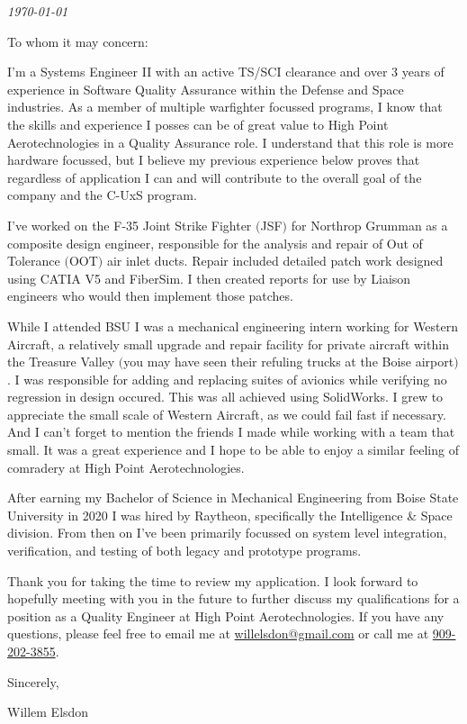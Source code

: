 \documentclass{ExpressiveCoverLetter}
\begin{document}
\coverletterheader[
    firstname=Willem,
    middleinitial=N,
    lastname=Elsdon,
    email=willelsdon@gmail.com,
    phone=909-202-3855,
    linkedin=willem-elsdon,
    github=welsdon,
    city=Boise,
    state=Idaho
]

\vspace{0.05in}
\emph{\today}
\vspace{0.15in}


To whom it may concern:

I'm a Systems Engineer II with an active TS/SCI clearance and over 3 years of experience in Software
Quality Assurance within the Defense and Space industries. As a member
of multiple warfighter focussed programs, I know that
the skills and experience I posses can be of great value to High Point
Aerotechnologies in a Quality Assurance role. I understand that this
role is more hardware focussed, but I believe my previous experience
below proves that regardless of application I can and will contribute to
the overall goal of the company and the C-UxS program.

I've worked on the F-35 Joint Strike Fighter $($JSF$)$ for Northrop
Grumman as a composite design engineer, responsible for the analysis and
repair of
Out of Tolerance $($OOT$)$ air inlet ducts. Repair included detailed
patch work designed using CATIA V5 and FiberSim. I then created reports
for use by Liaison engineers who would then implement those patches.

While I attended BSU I was a mechanical engineering intern working for
Western Aircraft, a relatively small upgrade and repair facility for
private aircraft within the Treasure Valley $($you may have seen their
refuling trucks at the Boise airport$)$. I was responsible for
adding and replacing suites of avionics while verifying no regression in
design occured. This was all achieved using SolidWorks. I grew to
appreciate the small scale of Western Aircraft, as we could fail fast if necessary.
And I can't forget to mention the friends I made while working with a team that small.
It was a great experience and I hope to be able to enjoy a similar
feeling of comradery at High Point Aerotechnologies.

After earning my Bachelor of Science in Mechanical Engineering from
Boise State University in 2020 I was hired by Raytheon, specifically the
Intelligence \& Space division. From then on I've been primarily focussed
on system level integration, verification, and testing of both legacy
and prototype programs.

Thank you for taking the time to review my application. I look forward
to hopefully meeting with you in the future to further discuss my
qualifications for a position as a Quality Engineer at High Point Aerotechnologies.
If you have any questions, please feel free to
email me at \href{mailto:willelsdon@gmail.com}{willelsdon@gmail.com} or
call me at \href{tel:+1-909-202-3855}{909-202-3855}.

Sincerely,

\vspace{0.15in}

Willem Elsdon
\end{document}
